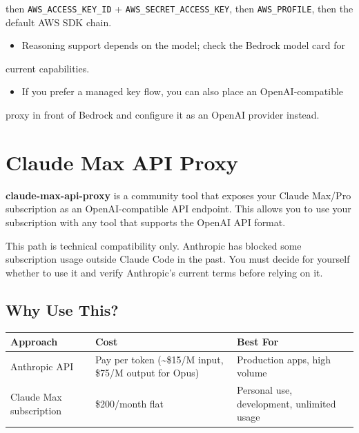 then \texttt{AWS\_ACCESS\_KEY\_ID} + \texttt{AWS\_SECRET\_ACCESS\_KEY}, then \texttt{AWS\_PROFILE}, then the
default AWS SDK chain.
\begin{itemize}
  \item Reasoning support depends on the model; check the Bedrock model card for
\end{itemize}

current capabilities.
\begin{itemize}
  \item If you prefer a managed key flow, you can also place an OpenAI‑compatible
\end{itemize}

proxy in front of Bedrock and configure it as an OpenAI provider instead.


\clearpage

\section{Claude Max API Proxy}


\textbf{claude-max-api-proxy} is a community tool that exposes your Claude Max/Pro subscription as an OpenAI-compatible API endpoint. This allows you to use your subscription with any tool that supports the OpenAI API format.

This path is technical compatibility only. Anthropic has blocked some subscription
usage outside Claude Code in the past. You must decide for yourself whether to use
it and verify Anthropic's current terms before relying on it.

\subsection{Why Use This?}



\begin{table}[h]
\centering
\small
\begin{tabular}{|l|l|l|}
\hline
Approach & Cost & Best For \\
\hline
Anthropic API & Pay per token (\textasciitilde{}\$15/M input, \$75/M output for Opus) & Production apps, high volume \\
\hline
Claude Max subscription & \$200/month flat & Personal use, development, unlimited usage \\
\hline
\end{tabular}
\end{table}



